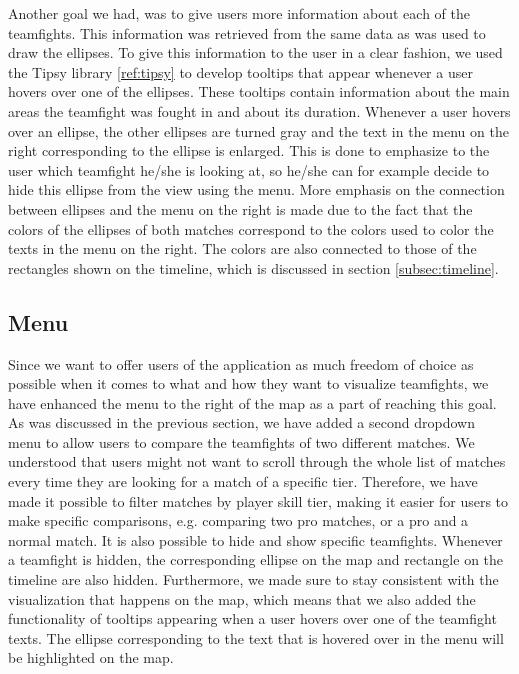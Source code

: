 \documentclass[11pt,twoside,a4paper]{article}
\begin{document}
Another goal we had, was to give users more information about each of the teamfights. This information was retrieved from the same data as was used to draw the ellipses. To give this information to the user in a clear fashion, we used the Tipsy library \ref{ref:tipsy}
to develop tooltips that appear whenever a user hovers over one of the ellipses. These tooltips contain information about the main areas the teamfight was fought in and about its duration. Whenever a user hovers over an ellipse, the other ellipses are turned gray and the text in the menu on the right corresponding to the ellipse is enlarged. This is done to emphasize to the user which teamfight he/she is looking at, so he/she can for example decide to hide this ellipse from the view using the menu.\newline\newline
More emphasis on the connection between ellipses and the menu on the right is made due to the fact that the colors of the ellipses of both matches correspond to the colors used to color the texts in the menu on the right. The colors are also connected to those of the rectangles shown on the timeline, which is discussed in section \ref{subsec:timeline}.
\newpage
\subsection{Menu}
\label{subsec:menu}
Since we want to offer users of the application as much freedom of choice as possible when it comes to what and how they want to visualize teamfights, we have enhanced the menu to the right of the map as a part of reaching this goal. As was discussed in the previous section, we have added a second dropdown menu to allow users to compare the teamfights of two different matches. We understood that users might not want to scroll through the whole list of matches every time they are looking for a match of a specific tier. Therefore, we have made it possible to filter matches by player skill tier, making it easier for users to make specific comparisons, e.g. comparing two pro matches, or a pro and a normal match. It is also possible to hide and show specific teamfights. Whenever a teamfight is hidden, the corresponding ellipse on the map and rectangle on the timeline are also hidden.
\newline\newline
Furthermore, we made sure to stay consistent with the visualization that happens on the map, which means that we also added the functionality of tooltips appearing when a user hovers over one of the teamfight texts. The ellipse corresponding to the text that is hovered over in the menu will be highlighted on the map.
\end{document}
